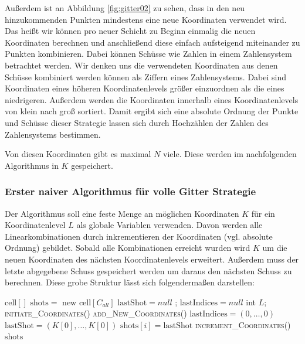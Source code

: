 \documentclass[a4paper,12pt]{llncs}
\numberwithin{equation}{section}
\begin{document}
Außerdem ist an Abbildung \ref{fig:gitter02} zu sehen, dass in den neu hinzukommenden Punkten mindestens eine neue Koordinaten verwendet wird. Das heißt wir können pro neuer Schicht zu Beginn einmalig die neuen Koordinaten berechnen und anschließend diese einfach aufsteigend miteinander zu Punkten kombinieren. Dabei können Schüsse wie Zahlen in einem Zahlensystem betrachtet werden. Wir denken uns die verwendeten Koordinaten aus denen Schüsse kombiniert werden können als Ziffern eines Zahlensystems. Dabei sind Koordinaten eines höheren Koordinatenlevels größer einzuordnen als die eines niedrigeren. Außerdem werden die Koordinaten innerhalb eines Koordinatenlevels von klein nach groß sortiert. Damit ergibt sich eine absolute Ordnung der Punkte und Schüsse dieser Strategie lassen sich durch Hochzählen der Zahlen des Zahlensystems bestimmen.

Von diesen Koordinaten gibt es maximal $N$ viele. Diese werden im nachfolgenden Algorithmus in $K$ gespeichert.

\subsubsection{Erster naiver Algorithmus für volle Gitter Strategie}

Der Algorithmus soll eine feste Menge an möglichen Koordinaten $K$ für ein Koordinatenlevel $L$ als globale Variablen verwenden. Davon werden alle Linearkombinationen durch inkrementieren der Koordinaten (vgl. absolute Ordnung) gebildet. Sobald alle Kombinationen erreicht wurden wird $K$ um die neuen Koordinaten des nächsten Koordinatenlevels erweitert. Außerdem muss der letzte abgegebene Schuss gespeichert werden um daraus den nächsten Schuss zu berechnen. Diese grobe Struktur lässt sich folgendermaßen darstellen:

\begin{tcolorbox}
	\begin{algorithmic}
		\State $\text{cell}[]\text{ shots} = \text{ new } \text{cell}[C_{all}]$
		\State $\text{lastShot}=null$ ; $\text{lastIndices}=null$
		\State int $L$;
		\State \textsc{initiate\_Coordinates}()
		\EndIf
		\State \textsc{add\_New\_Coordinates}()
		\EndIf
		\State $\text{lastIndices} = (0,\dots,0)$
		\State $\text{lastShot} = (K[0],\dots,K[0])$
		\State $\text{shots}[i] = \text{lastShot}$
		\Else
		\State \textsc{increment\_Coordinates}()
		\EndIf
		\EndFor
		\State\Return $\text{shots}$
		\EndFunction
	\end{algorithmic}
\end{tcolorbox}
\end{document}
